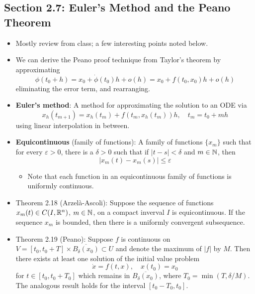 \documentclass[../notes.tex]{subfiles}
\begin{document}
\subsection*{Section 2.7: Euler's Method and the Peano Theorem}
\begin{itemize}
    \item Mostly review from class; a few interesting points noted below.
    \item We can derive the Peano proof technique from Taylor's theorem by approximating
    \begin{equation*}
        \phi(t_0+h) = x_0+\dot{\phi}(t_0)h+o(h)
        = x_0+f(t_0,x_0)h+o(h)
    \end{equation*}
    eliminating the error term, and rearranging.
    \item \textbf{Euler's method}: A method for approximating the solution to an ODE via
    \begin{equation*}
        x_h(t_{m+1}) = x_h(t_m)+f(t_m,x_h(t_m))h
        ,\quad
        t_m = t_0+mh
    \end{equation*}
    using linear interpolation in between.
    \item \textbf{Equicontinuous} (family of functions): A family of functions $\{x_m\}$ such that for every $\varepsilon>0$, there is a $\delta>0$ such that if $|t-s|<\delta$ and $m\in\mathbb{N}$, then
    \begin{equation*}
        |x_m(t)-x_m(s)| \leq \varepsilon
    \end{equation*}
    \begin{itemize}
        \item Note that each function in an equicontinuous family of functions is uniformly continuous.
    \end{itemize}
    \item Theorem 2.18 (Arzel\`{a}-Ascoli): Suppose the sequence of functions $x_m(t)\in C(I,\mathbb{R}^n)$, $m\in\mathbb{N}$, on a compact inverval $I$ is equicontinuous. If the sequence $x_m$ is bounded, then there is a uniformly convergent subsequence.
    \item Theorem 2.19 (Peano): Suppose $f$ is continuous on $V=[t_0,t_0+T]\times\overline{B_\delta(x_0)}\subset U$ and denote the maximum of $|f|$ by $M$. Then there exists at least one solution of the initial value problem
    \begin{equation*}
        \dot{x} = f(t,x)
        ,\quad
        x(t_0) = x_0
    \end{equation*}
    for $t\in[t_0,t_0+T_0]$ which remains in $\overline{B_\delta(x_0)}$, where $T_0=\min(T,\delta/M)$. The analogous result holds for the interval $[t_0-T_0,t_0]$.

\end{itemize}
\end{document}
